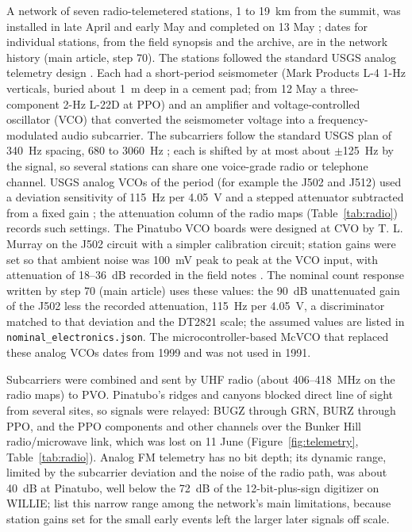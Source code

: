 \documentclass[11pt]{article}
\newcommand{\file}[1]{\texttt{#1}}
\begin{document}
A network of seven radio-telemetered stations, 1 to 19~km from the summit, was installed in late April and early May \citep{Harlow_1996} and completed on 13 May \citep{Power_1996}; dates for individual stations, from the field synopsis and the archive, are in the network history (main article, step 70). The stations followed the standard USGS analog telemetry design \citep{Lockhart_1996}. Each had a short-period seismometer (Mark Products L-4 1-Hz verticals, buried about 1~m deep in a cement pad; from 12 May a three-component 2-Hz L-22D at PPO) and an amplifier and voltage-controlled oscillator (VCO) that converted the seismometer voltage into a frequency-modulated audio subcarrier. The subcarriers follow the standard USGS plan of 340~Hz spacing, 680 to 3060~Hz \citep{McChesney_1999}; each is shifted by at most about $\pm$125~Hz by the signal, so several stations can share one voice-grade radio or telephone channel. USGS analog VCOs of the period (for example the J502 and J512) used a deviation sensitivity of 115~Hz per 4.05~V and a stepped attenuator subtracted from a fixed gain \citep{McChesney_1999}; the attenuation column of the radio maps (Table~\ref{tab:radio}) records such settings. The Pinatubo VCO boards were designed at CVO by T. L. Murray on the J502 circuit with a simpler calibration circuit; station gains were set so that ambient noise was 100~mV peak to peak at the VCO input, with attenuation of 18--36~dB recorded in the field notes \citep{Lockhart_1996}. The nominal count response written by step 70 (main article) uses these values: the 90~dB unattenuated gain of the J502 \citep{McChesney_1999} less the recorded attenuation, 115~Hz per 4.05~V, a discriminator matched to that deviation and the DT2821 scale; the assumed values are listed in \file{nominal\_electronics.json}. The microcontroller-based McVCO that replaced these analog VCOs dates from 1999 and was not used in 1991.

Subcarriers were combined and sent by UHF radio (about 406--418~MHz on the radio maps) to PVO. Pinatubo's ridges and canyons blocked direct line of sight from several sites, so signals were relayed: BUGZ through GRN, BURZ through PPO, and the PPO components and other channels over the Bunker Hill radio/microwave link, which was lost on 11 June (Figure~\ref{fig:telemetry}, Table~\ref{tab:radio}). Analog FM telemetry has no bit depth; its dynamic range, limited by the subcarrier deviation and the noise of the radio path, was about 40~dB at Pinatubo, well below the 72~dB of the 12-bit-plus-sign digitizer on WILLIE; \citet{Lockhart_1996} list this narrow range among the network's main limitations, because station gains set for the small early events left the larger later signals off scale.
\end{document}
